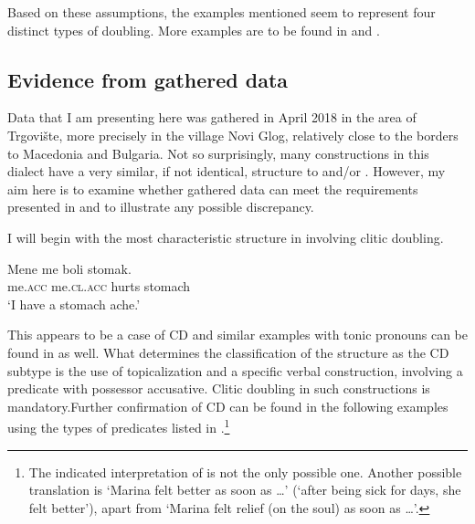 \documentclass[output=paper,
colorlinks,
citecolor=brown,
newtxmath
]{langscibook}
\begin{document}
\noindent Based on these assumptions, the examples mentioned seem to represent four distinct types of doubling. More examples are to be found in \citet{Krapova.Karastaneva2002} and \citet{Cinque.Krapova2008}.

\subsection{Evidence from gathered data}                            %
\label{subsec:evidence}
Data that I am presenting here was gathered in April 2018 in the area of Trgovište, more precisely in the village Novi Glog, relatively close to the borders to Macedonia and Bulgaria. Not so surprisingly, many constructions in this dialect have a very similar, if not identical, structure to  and/or . However, my aim here is to examine whether gathered data can meet the requirements presented in \citet{Cinque.Krapova2008} and to illustrate any possible discrepancy.

I will begin with the most characteristic structure in  involving clitic doubling.


\ea\label{ex:zivojinovic:10}
\gll Mene   me        boli  stomak.\\
     me.\textsc{acc} me.\textsc{cl.acc} hurts stomach \\
\glt `I have a stomach ache.'
\z

\largerpage[-2] %
\noindent This appears to be a case of CD and similar examples with tonic pronouns can be found in  as well. What determines the classification of the structure as the CD subtype is the use of topicalization and a specific verbal construction, involving a predicate with possessor accusative. Clitic doubling in such constructions is mandatory.\largerpage[-1] %
Further confirmation of CD can be found in the following examples using the types of predicates listed in \citet{Cinque.Krapova2008}.\footnote{The indicated interpretation of  is not the only possible one. Another possible translation is `Marina felt better as soon as {\dots}' (`after being sick for days, she felt better'), apart from `Marina felt relief (on the soul) as soon as {\dots}'.}
\end{document}
